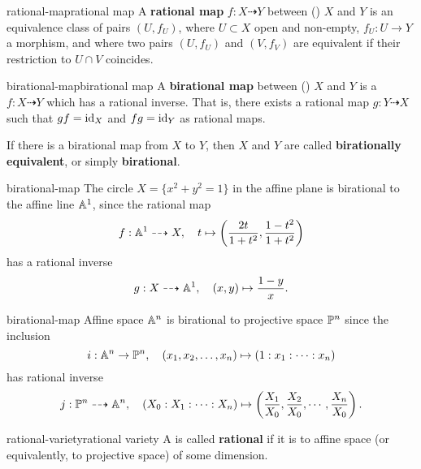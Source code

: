 \begin{topic}{rational-map}{rational map}
    A \textbf{rational map} $f : X \dashrightarrow Y$ between ()  $X$ and $Y$ is an equivalence class of pairs $(U, f_U)$, where $U \subset X$ open and non-empty, $f_U : U \to Y$ a morphism, and where two pairs $(U, f_U)$ and $(V, f_V)$ are equivalent if their restriction to $U \cap V$ coincides.
\end{topic}

\begin{topic}{birational-map}{birational map}
    A \textbf{birational map} between ()  $X$ and $Y$ is a  $f : X \dashrightarrow Y$ which has a rational inverse. That is, there exists a rational map $g : Y \dashrightarrow X$ such that $gf = \id_X$ and $fg = \id_Y$ as rational maps.
    
    If there is a birational map from $X$ to $Y$, then $X$ and $Y$ are called \textbf{birationally equivalent}, or simply \textbf{birational}.
\end{topic}

\begin{example}{birational-map}
    The circle $X = \{ x^2 + y^2 = 1 \}$ in the affine plane is birational to the affine line $\AA^1$, since the rational map
    \[ f : \AA^1 \dashrightarrow X, \quad t \mapsto \left(\frac{2t}{1 + t^2}, \frac{1 - t^2}{1 + t^2}\right) \]
    has a rational inverse
    \[ g : X \dashrightarrow \AA^1, \quad (x, y) \mapsto \frac{1 - y}{x} . \]
\end{example}

\begin{example}{birational-map}
    Affine space $\AA^n$ is birational to projective space $\PP^n$ since the inclusion
    \[ i : \AA^n \to \PP^n, \quad (x_1, x_2, \ldots, x_n) \mapsto (1 : x_1 : \cdots : x_n) \]
    has rational inverse
    \[ j : \PP^n \dashrightarrow \AA^n, \quad (X_0 : X_1 : \cdots : X_n) \mapsto \left(\frac{X_1}{X_0}, \frac{X_2}{X_0}, \cdots, \frac{X_n}{X_0}\right) . \]
\end{example}

\begin{topic}{rational-variety}{rational variety}
    A  is called \textbf{rational} if it is  to affine space (or equivalently, to projective space) of some dimension.
\end{topic}

